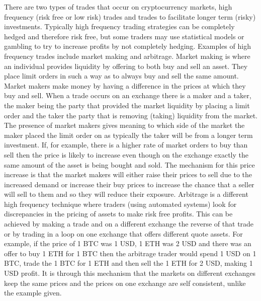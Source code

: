 \documentclass[a4paper,10pt]{article}
\begin{document}
There are two types of trades that occur on cryptocurrency markets, high frequency (risk free or low risk) trades and trades to facilitate longer term (risky) investments. Typically high frequency trading strategies can be completely hedged and therefore risk free, but some traders may use statistical models or gambling to try to increase profits by not completely hedging. Examples of high frequency trades include market making and arbitrage. Market making is where an individual provides liquidity by offering to both buy and sell an asset. They place limit orders in such a way as to always buy and sell the same amount. Market makers make money by having a difference in the prices at which they buy and sell\cite{marketmaking}. When a trade occurs on an exchange there is a maker and a taker, the maker being the party that provided the market liquidity by placing a limit order and the taker the party that is removing (taking) liquidity from the market. The presence of market makers gives meaning to which side of the market the maker placed the limit order on as typically the taker will be from a longer term investment. If, for example, there is a higher rate of market orders to buy than sell then the price is likely to increase even though on the exchange exactly the same amount of the asset is being bought and sold. The mechanism for this price increase is that the market makers will either raise their prices to sell due to the increased demand or increase their buy prices to increase the chance that a seller will sell to them and so they will reduce their exposure. Arbitrage is a different high frequency technique where traders (using automated systems) look for discrepancies in the pricing of assets to make risk free profits. This can be achieved by making a trade and on a different exchange the reverse of that trade or by trading in a loop on one exchange that offers different quote assets. For example, if the price of 1 BTC was 1 USD, 1 ETH was 2 USD and there was an offer to buy 1 ETH for 1 BTC then the arbitrage trader would spend 1 USD on 1 BTC, trade the 1 BTC for 1 ETH and then sell the 1 ETH for 2 USD, making 1 USD profit. It is through this mechanism that the markets on different exchanges keep the same prices and the prices on one exchange are self consistent, unlike the example given. \\ \\
\end{document}
